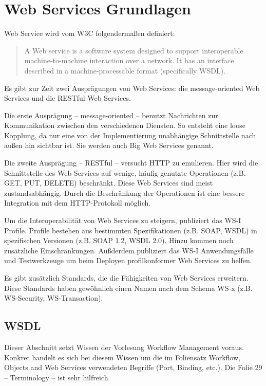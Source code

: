 \documentclass[runningheads]{llncs}
\newcommand{\germanquote}[1]{\glqq{}#1\grqq{}}
\begin{document}
  \label{ws}
  \section{Web Services Grundlagen}
  \nocite{wk_ws}
    \germanquote{Web Service} wird vom W3C folgendermaßen definiert:
    \begin{quote}
      A Web service is a software system designed to support interoperable machine-to-machine interaction over a network. It has an interface described in a machine-processable format (specifically WSDL).\cite{w3c_wsgloss_ws}
    \end{quote}

    Es gibt zur Zeit zwei Ausprägungen von Web Services: die \germanquote{message-oriented Web Services} und die \germanquote{RESTful Web Services}.

    Die erste Ausprägung -- message-oriented -- benutzt Nachrichten zur Kommunikation zwischen den verschiedenen Diensten. So entsteht eine loose Kopplung, da nur eine von der Implementierung unabhängige Schnittstelle nach außen hin sichtbar ist. Sie werden auch \germanquote{Big Web Services} genannt. %

    Die zweite Ausprägung -- RESTful -- versucht HTTP zu emulieren. Hier wird die Schnittstelle des Web Services auf wenige, häufig genutzte Operationen (z.B. GET, PUT, DELETE) beschränkt. Diese Web Services sind meist zustandsabhängig. Durch die Beschränkung der Operationen ist eine bessere Integration mit dem HTTP-Protokoll möglich. %

    Um die Interoperabilität von Web Services zu steigern, publiziert das WS-I\cite{wsi_hp} Profile. Profile bestehen aus bestimmten Spezifikationen (z.B. SOAP, WSDL) in spezifischen Versionen (z.B. SOAP 1.2, WSDL 2.0). Hinzu kommen noch zusätzliche Einschränkungen. Außderdem publiziert das WS-I Anwendungsfälle und Testwerkzeuge um beim Deployen profilkonformer Web Services zu helfen.

    Es gibt zusätzlich Standards, die die Fähigkeiten von Web Services erweitern. Diese Standards haben gewöhnlich einen Namen nach dem Schema \germanquote{WS-x} (z.B. WS-Security, WS-Transaction). %

  \subsection{WSDL}
  \label{wsdl}
  \nocite{wk_wsdl}
    Dieser Abschnitt setzt Wissen der Vorlesung \germanquote{Workflow Management}\cite{wfm_site} voraus. Konkret handelt es sich bei diesem Wissen um die im Foliensatz \germanquote{Workflow, Objects and Web Services}\cite{wfm_ch7} verwendeten Begriffe (Port, Binding, etc.). Die Folie 29 -- Terminology -- ist sehr hilfreich.
\end{document}
